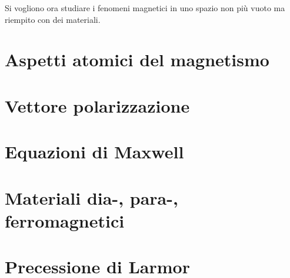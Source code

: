 Si vogliono ora studiare i fenomeni magnetici in uno spazio non più vuoto ma riempito con dei materiali.

\section{Aspetti atomici del magnetismo}


\section{Vettore polarizzazione}


\section{Equazioni di Maxwell}


\section{Materiali dia-, para-, ferromagnetici}


\section{Precessione di Larmor}

